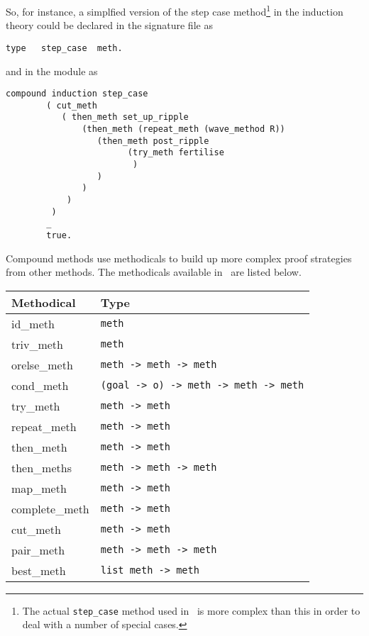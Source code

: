 So, for instance, a simplfied version of the step case method\footnote{The actual {\tt step\_case} method used in \lclam\ is more complex than this in order to deal with a number of special cases.} in the 
induction theory could be declared in the signature
file as  

\begin{verbatim}
type   step_case  meth.  
\end{verbatim}

and in the module as

\begin{verbatim}
compound induction step_case
        ( cut_meth
           ( then_meth set_up_ripple 
               (then_meth (repeat_meth (wave_method R))
                  (then_meth post_ripple
                        (try_meth fertilise                                 
                         )
                  )
               )
            )
         )
        _
        true.
\end{verbatim}

Compound methods use
methodicals to build up more complex proof
strategies from other methods.  The methodicals available in \lclam\ 
are listed below.
\begin{center}
\begin{tabular}{|l|l|} \hline
Methodical & Type \\ \hline
id\_meth\index{id\_meth} & {\tt meth} \\ 
triv\_meth\index{triv\_meth} & {\tt meth} \\
orelse\_meth\index{orelse\_meth} & {\tt meth -> meth -> meth} \\
cond\_meth\index{cond\_meth} & {\tt (goal -> o) -> meth -> meth ->
meth} \\
try\_meth\index{try\_meth} & {\tt meth -> meth} \\
repeat\_meth\index{repeat\_meth} & {\tt meth -> meth} \\
then\_meth\index{then\_meth} & {\tt meth -> meth} \\
then\_meths\index{then\_meths} & {\tt meth -> meth -> meth} \\
map\_meth\index{map\_meth} & {\tt meth -> meth} \\
complete\_meth\index{complete\_meth} & {\tt meth -> meth} \\
cut\_meth\index{cut\_meth} & {\tt meth -> meth} \\
pair\_meth\index{pair\_meth} & {\tt meth -> meth -> meth} \\ 
best\_meth\index{best\_meth} & {\tt list meth -> meth} \\ \hline
\end{tabular}
\end{center}

